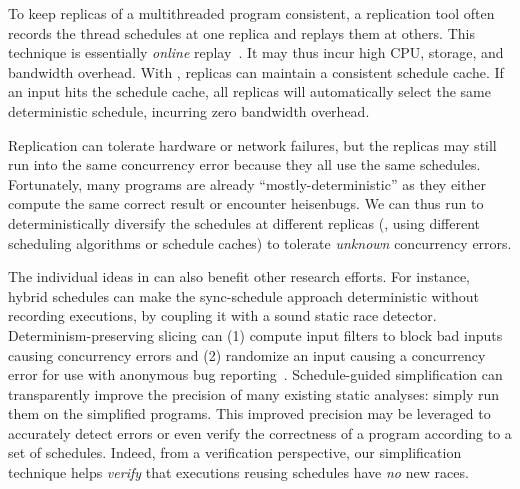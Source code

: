 To keep replicas of a multithreaded program consistent, a replication tool
often records the thread schedules at one replica and replays them at
others.  This technique is essentially \emph{online}
replay~\cite{respec:asplos10}.
It may thus incur high CPU, storage, and
bandwidth overhead.  With \peregrine, replicas can maintain a consistent
schedule cache.  If an input hits the schedule cache, all replicas will
automatically select the same deterministic schedule, incurring zero
bandwidth overhead.

  Replication can tolerate
hardware or network failures, but the replicas may still run into the same
concurrency error because they all use the same schedules.  Fortunately,
many programs are already ``mostly-deterministic'' as they either compute
the same correct result or encounter heisenbugs.  We can thus run \peregrine to
deterministically diversify the schedules at different replicas (\eg,
using different scheduling algorithms or schedule caches) to tolerate
\emph{unknown} concurrency errors.

 The individual ideas in \peregrine
can also benefit other research efforts.  For instance, hybrid schedules
can make the sync-schedule approach deterministic without recording
executions, by coupling it with a sound static race detector.
Determinism-preserving slicing can (1) compute input filters to block bad
inputs~\cite{castro:bouncer} causing concurrency errors and (2) randomize
an input causing a concurrency error for use with anonymous bug
reporting~\cite{castro:bug-report-privacy}.  Schedule-guided
simplification can transparently improve the precision of many existing
static analyses: simply run them on the simplified programs.  This improved
precision may be leveraged to accurately detect errors or even
verify the correctness of a program according to a set of schedules.
Indeed, from a verification perspective, our simplification technique
helps \emph{verify} that executions reusing schedules have \emph{no}
new races.

